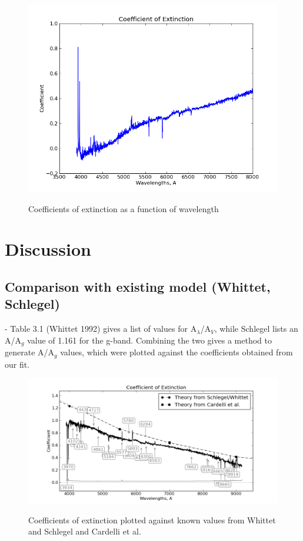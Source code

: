 \documentclass[preprint]{aastex}
\begin{document}
\begin{figure}
\includegraphics[width=12cm]{coeffsdr9experr2}\\
\caption{Coefficients of extinction as a function of wavelength}
\end{figure}

\section{Discussion}
\subsection{Comparison with existing model (Whittet, Schlegel)}
- Table 3.1 (Whittet 1992) gives a list of values for A$_\lambda$/A$_V$, while Schlegel lists an A/A$_g$ value of 1.161 for the g-band. Combining the two gives a method to generate A/A$_g$ values, which were plotted against the coefficients obtained from our fit.
\begin{figure}
\includegraphics[width=12cm]{test_curvefit_coefficients_ivar2}\\
\caption{Coefficients of extinction plotted against known values from Whittet and Schlegel and Cardelli et al.}
\end{figure}
\end{document}
